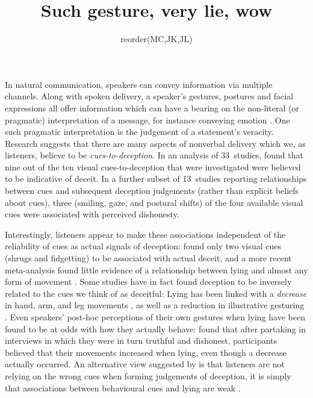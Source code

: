 \documentclass[a4paper,man,natbib]{apa6}
\title{Such gesture, very lie, wow}
\author{reorder(MC,JK,JL)}
\affiliation{Psychology, PPLS, University of Edinburgh}
\newcommand*{\term}[1]{\emph{#1}} %
\begin{document}
\maketitle
\linenumbers
\noindent
In natural communication, speakers can convey information via multiple channels.
Along with spoken delivery, a speaker's gestures, postures and facial expressions all offer information which can have a bearing on the non-literal (or pragmatic) interpretation of a message, for instance conveying emotion \citep{Busso2004, Gregersen2005}.
One such pragmatic interpretation is the judgement of a statement's veracity.
Research suggests that there are many aspects of nonverbal delivery which we, as listeners, believe to be \term{cues-to-deception}. 
In an analysis of 33~studies, \citet{Zuckerman1981} found that nine out of the ten visual cues-to-deception that were investigated were believed to be indicative of deceit. 
In a further subset of 13~studies reporting relationships between cues and subsequent deception judgements (rather than explicit beliefs about cues), three (smiling, gaze, and postural shifts) of the four available visual cues were associated with perceived dishonesty.

Interestingly, listeners appear to make these associations independent of the reliability of cues as actual signals of deception: \citet{Zuckerman1981} found only two visual cues (shrugs and fidgetting) to be associated with actual deceit, and a more recent meta-analysis found little evidence of a relationship between lying and almost any form of movement \citep{DePaulo2003}.
Some studies have in fact found deception to be inversely related to the cues we think of as deceitful:
Lying has been linked with a \emph{decrease} in hand, arm, and leg movements \citep[e.g.][]{DePaulo1992, Ekman1989, Vrij1995}, as well as a reduction in illustrative gesturing \citep[e.g.][]{DePaulo2003, Cohen2010}.
Even speakers' post-hoc perceptions of their own gestures when lying have been found to be at odds with how they actually behave:
\citet{Vrij1996} found that after partaking in interviews in which they were in turn truthful and dishonest, participants believed that their movements increased when lying, even though a decrease actually occurred.
An alternative view suggested by \citet{Hartwig2011} is that listeners are not relying on the wrong cues when forming judgements of deception, it is simply that associations between behavioural cues and lying are weak \citep{Hartwig2011}.
\end{document}
